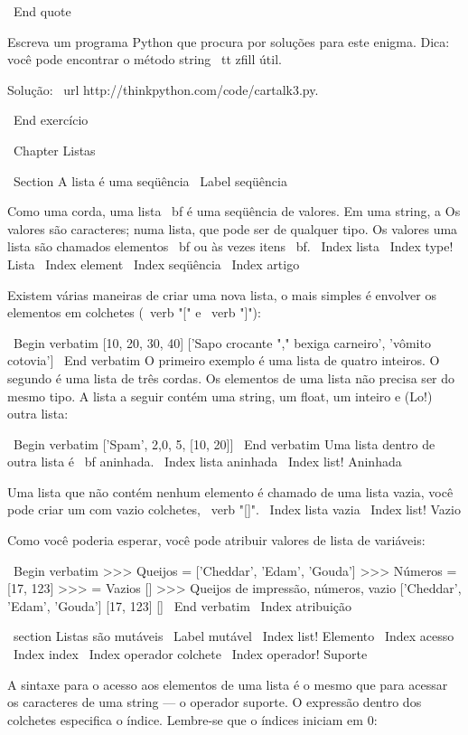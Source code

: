 \documentclass[10pt]{book}
\begin{document}
\begin {itemize}
{{{{{{\ End {quote}

Escreva um programa Python que procura por soluções para este enigma.
Dica: você pode encontrar o método string {\ tt zfill} útil.

Solução: \ url {http://thinkpython.com/code/cartalk3.py}.

\ End {} exercício



\ Chapter {Listas}

\ Section {A lista é uma seqüência}
\ Label {seqüência}

Como uma corda, uma lista {\ bf} é uma seqüência de valores. Em uma string, a
Os valores são caracteres; numa lista, que pode ser de qualquer tipo. Os valores
uma lista são chamados elementos {\ bf} ou às vezes {itens \ bf}.
\ Index {lista}
\ Index {type! Lista}
\ Index {element}
\ Index {seqüência}
\ Index {artigo}

Existem várias maneiras de criar uma nova lista, o mais simples é
envolver os elementos em colchetes (\ verb "[" e \ verb "]"):

\ Begin {verbatim}
[10, 20, 30, 40]
['Sapo crocante "," bexiga carneiro', 'vômito cotovia']
\ End {verbatim}
%
O primeiro exemplo é uma lista de quatro inteiros. O segundo é uma lista de
três cordas. Os elementos de uma lista não precisa ser do mesmo tipo.
A lista a seguir contém uma string, um float, um inteiro e
(Lo!) outra lista:

\ Begin {verbatim}
['Spam', 2,0, 5, [10, 20]]
\ End {verbatim}
%
Uma lista dentro de outra lista é {\ bf aninhada}.
\ Index {lista aninhada}
\ Index {list! Aninhada}

Uma lista que não contém nenhum elemento é
chamado de uma lista vazia, você pode criar um com vazio
colchetes, \ verb "[]".
\ Index {lista vazia}
\ Index {list! Vazio}

Como você poderia esperar, você pode atribuir valores de lista de variáveis:

\ Begin {verbatim}
>>> Queijos = ['Cheddar', 'Edam', 'Gouda']
>>> Números = [17, 123]
>>> = Vazios []
>>> Queijos de impressão, números, vazio
['Cheddar', 'Edam', 'Gouda'] [17, 123] []
\ End {verbatim}
%
\ Index {atribuição}


\ section {} Listas são mutáveis
\ Label {} mutável
\ Index {list! Elemento}
\ Index {acesso}
\ Index {index}
\ Index {operador colchete}
\ Index {operador! Suporte}

A sintaxe para o acesso aos elementos de uma lista é o mesmo que para
acessar os caracteres de uma string --- o operador suporte. O
expressão dentro dos colchetes especifica o índice. Lembre-se que o
índices iniciam em 0:

}}}}}}
\end{itemize}
\end{document}
